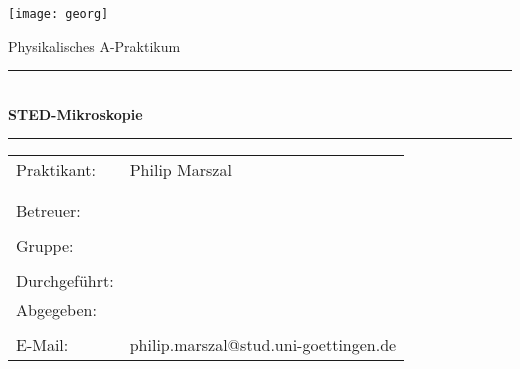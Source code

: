 \documentclass[a4paper, 12pt]{article}
\begin{document}
 \begin{titlepage}
 \begin{figure*}[t]
 \texttt{[image: georg]} \hfill
 \end{figure*}

\normalsize
\vspace{1cm}

\begin{center}
\Large Physikalisches A-Praktikum \\ \vspace{1cm}
\hrule \vspace{3mm}
\large {} \\
\Huge{\bf STED-Mikroskopie}
\vspace{5mm}
\hrule
\end{center}

\normalsize

\begin{table}[!h]
\begin{center}

  \begin{tabular}{ll}
  Praktikant: &Philip Marszal\\
   &\\
   &\\
  Betreuer: & \\
  &\\
  Gruppe: &\\
  &\\
  Durchgeführt: &\\
  Abgegeben: &\\

\vspace{1cm}& \\
  E-Mail: & \ttfamily philip.marszal@stud.uni-goettingen.de\\
\end{tabular}
\end{center}
\end{table}
\vspace{2cm}
\flushright{}
\end{titlepage}

\thispagestyle{empty}
\newpage
\thispagestyle{empty}
\tableofcontents
\newpage
\end{document}
